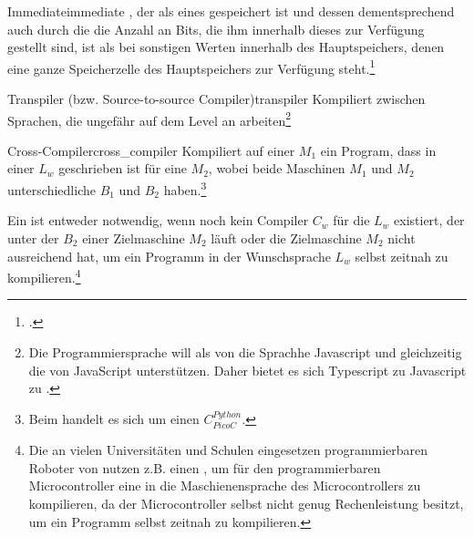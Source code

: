 \begin{Definition}{Immediate}{immediate}
  , der als  eines  gespeichert ist und dessen  dementsprechend auch durch die die Anzahl an Bits, die ihm innerhalb dieses  zur Verfügung gestellt sind,  ist als bei sonstigen Werten innerhalb des Hauptspeichers, denen eine ganze Speicherzelle des Hauptspeichers zur Verfügung steht.\footcite{ljohhuh_what_2018}
\end{Definition}

\begin{Definition}{Transpiler (bzw. Source-to-source Compiler)}{transpiler}
  Kompiliert zwischen Sprachen, die ungefähr auf dem  Level an  arbeiten\footnote{Die Programmiersprache  will als  von  die Sprachhe Javascript  und gleichzeitig die  von JavaScript unterstützen. Daher bietet es sich Typescript zu Javascript zu .}
\end{Definition}

\begin{Definition}{Cross-Compiler}{cross_compiler}
  Kompiliert auf einer  $M_1$ ein Program, dass in einer  $L_w$ geschrieben ist für eine  $M_2$, wobei beide Maschinen $M_1$ und $M_2$ unterschiedliche  $B_1$ und $B_2$ haben.\footnote{Beim  handelt es sich um einen  $C_{PicoC}^{Python}$.}
\end{Definition}

Ein  ist entweder notwendig, wenn noch kein Compiler $C_w$ für die  $L_w$ existiert, der unter der  $B_2$ einer Zielmaschine $M_2$ läuft oder die Zielmaschine $M_2$ nicht ausreichend  hat, um ein Programm in der Wunschsprache $L_w$ selbst zeitnah zu kompilieren.\footnote{Die an vielen Universitäten und Schulen eingesetzen programmierbaren Roboter von  nutzen z.B. einen , um für den programmierbaren Microcontroller eine  in die Maschienensprache des Microcontrollers zu kompilieren, da der Microcontroller selbst nicht genug Rechenleistung besitzt, um ein Programm selbst zeitnah zu kompilieren.}

